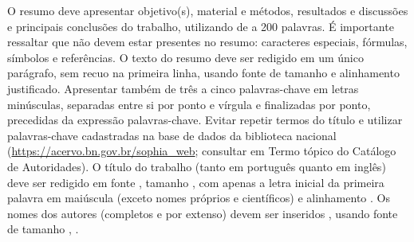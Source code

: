 \documentclass{article}
\begin{document}
\begin{Abstract}[brazilian]%
O resumo deve apresentar objetivo{(s)}, material e métodos, resultados e discussões e principais conclusões do trabalho, utilizando de  a 200 palavras.
É importante ressaltar que não devem estar presentes no resumo: caracteres especiais, fórmulas, símbolos e referências.
O texto do resumo deve ser redigido em um único parágrafo, sem recuo na primeira linha, usando fonte  de tamanho  e alinhamento justificado.
Apresentar também de três a cinco palavras-chave em letras minúsculas, separadas entre si por ponto e vírgula e finalizadas por ponto, precedidas da expressão palavras-chave.
Evitar repetir termos do título e utilizar palavras-chave cadastradas na base de dados da biblioteca nacional (\url{https://acervo.bn.gov.br/sophia_web}; consultar em Termo tópico do Catálogo de Autoridades).
O título do trabalho (tanto em português quanto em inglês) deve ser redigido em fonte , tamanho , com apenas a letra inicial da primeira palavra em maiúscula (exceto nomes próprios e científicos) e alinhamento .
Os nomes dos autores (completos e por extenso) devem ser inseridos , usando fonte  de tamanho , .
\end{Abstract}
\end{document}
